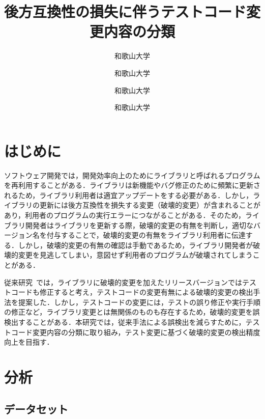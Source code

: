 \documentclass[uplatex,dvipdfmx,a4paper,twocolumn,base=11pt,jbase=11pt,ja=standard]{bxjsarticle}  %
\title{後方互換性の損失に伴うテストコード変更内容の分類}{A classification of test code changes accompanied by a lack of backward compatibility}
\author{和歌山大学}{前川　大樹}{Daiki Maekawa, Wakayama University}
\author{和歌山大学}{伊原　彰紀}{Akinori Ihara, Wakayama University}
\author{和歌山大学}{大森　楓己}{Fuki Omori, Wakayama University}
\author{和歌山大学}{才木　一也}{Kazuya Saiki, Wakayama University}
\begin{document}
\maketitle

\section{はじめに}

ソフトウェア開発では，開発効率向上のためにライブラリと呼ばれるプログラムを再利用することがある．ライブラリは新機能やバグ修正のために頻繁に更新されるため，ライブラリ利用者は適宜アップデートをする必要がある．しかし，ライブラリの更新には後方互換性を損失する変更（破壊的変更）が含まれることがあり，利用者のプログラムの実行エラーにつながることがある．そのため，ライブラリ開発者はライブラリを更新する際，破壊的変更の有無を判断し，適切なバージョン名を付与することで，破壊的変更の有無をライブラリ利用者に伝達する．しかし，破壊的変更の有無の確認は手動であるため，ライブラリ開発者が破壊的変更を見逃してしまい，意図せず利用者のプログラムが破壊されてしまうことがある．

従来研究~\cite{FOSE2021_Matsuda}では，ライブラリに破壊的変更を加えたリリースバージョンではテストコードも修正すると考え，テストコードの変更有無による破壊的変更の検出手法を提案した．しかし，テストコードの変更には，テストの誤り修正や実行手順の修正など，ライブラリ変更とは無関係のものも存在するため，破壊的変更を誤検出することがある．本研究では，従来手法による誤検出を減らすために，テストコード変更内容の分類に取り組み，テスト変更に基づく破壊的変更の検出精度向上を目指す．

\section{分析}
\subsection{データセット}
\end{document}
